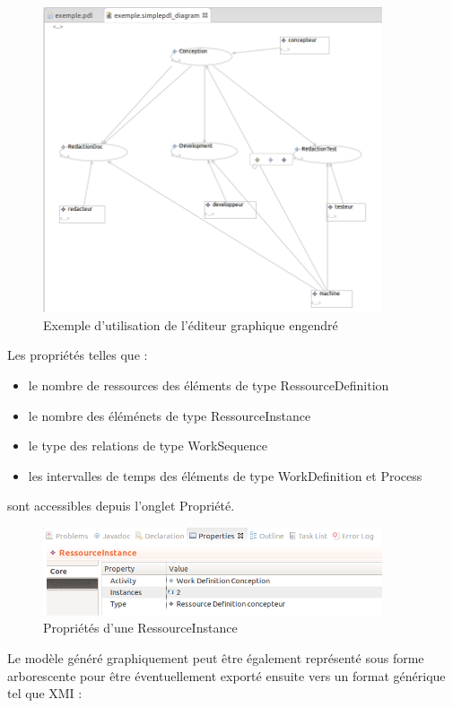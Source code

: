 \documentclass{report}
\begin{document}
\begin{figure}[!h] 
\begin{center}
\includegraphics[width=10cm]{Capture-8.png}
\caption{Exemple d'utilisation de l'éditeur graphique engendré} 
\label{img1} 
\end{center}
\end{figure} 

Les propriétés telles que :
\begin{itemize}
\item le nombre de ressources des éléments de type RessourceDefinition
\item le nombre des éléménets de type RessourceInstance
\item le type des relations de type WorkSequence 
\item les intervalles de temps des éléments de type WorkDefinition et Process
\end{itemize}
sont accessibles depuis l'onglet Propriété.

\begin{figure}[!h] 
\begin{center}
\includegraphics[width=10cm]{Capture-10.png}
\caption{Propriétés d'une RessourceInstance} 
\label{img1} 
\end{center}
\end{figure} 

Le modèle généré graphiquement peut être également représenté sous forme arborescente pour être éventuellement exporté ensuite vers un format générique tel que XMI :
\end{document}
